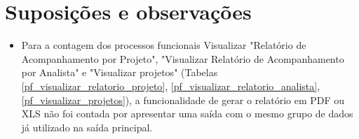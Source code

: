 \section{Suposições e observações}

    \begin{itemize}
      
      \item Para a contagem dos processos funcionais Visualizar "Relatório de Acompanhamento por Projeto",
	"Visualizar Relatório de Acompanhamento por Analista" e "Visualizar projetos" 
	(Tabelas \ref{pf_visualizar_relatorio_projeto}, \ref{pf_visualizar_relatorio_analista}, \ref{pf_visualizar_projetos}),
	a funcionalidade de gerar o relatório em PDF ou XLS não foi contada por apresentar uma saída com o mesmo grupo de 
	dados já utilizado na saída principal.
      
    \end{itemize}
